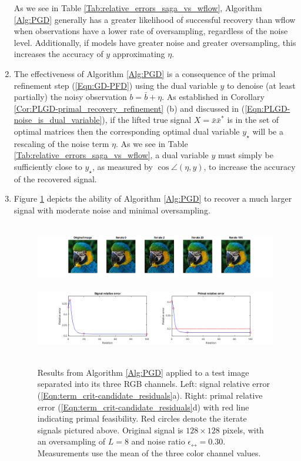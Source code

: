 \begin{enumerate}
As we see in Table \ref{Tab:relative_errors_saga_vs_wflow}, Algorithm \ref{Alg:PGD} generally has a greater likelihood of successful recovery than wflow when observations have a lower rate of oversampling, regardless of the noise level.  Additionally, if models have greater noise and greater oversampling, this increases the accuracy of $y$ approximating $\eta$.



\item

The effectiveness of Algorithm \ref{Alg:PGD} is a consequence of the primal refinement step (\ref{Eqn:GD-PFD}) using the dual variable $y$ to denoise (at least partially) the noisy observation $b = \bar{b} + \eta$.  As established in Corollary \ref{Cor:PLGD-primal_recovery_refinement} (b) and discussed in (\ref{Eqn:PLGD-noise_is_dual_variable}), if the lifted true signal $X = \bar{x}\bar{x}^*$ is in the set of optimal matrices then the corresponding optimal dual variable $y_\star$ will be a rescaling of the noise term $\eta$.  As we see in Table \ref{Tab:relative_errors_saga_vs_wflow}, a dual variable $y$ must simply be sufficiently close to $y_\star$, as measured by $\cos \angle (\eta, y)$, to increase the accuracy of the recovered signal.




\item

Figure \ref{Fig:parrot_signal_relative_error_2} depicts the ability of Algorithm \ref{Alg:PGD} to recover a much larger signal with moderate noise and minimal oversampling.

\begin{figure}[H]
\centering
\hbox{\hspace{-2.3cm} \includegraphics[scale=0.55]{parrot_signal_iterates} }
\hbox{\hspace{-2.5cm} \includegraphics[scale=0.6]{parrot_signal_relative_error_2} }
\caption{Results from Algorithm \ref{Alg:PGD} applied to a test image separated into its three RGB channels.  Left: signal relative error (\ref{Eqn:term_crit-candidate_residuals}a).  Right: primal relative error (\ref{Eqn:term_crit-candidate_residuals}d) with red line indicating primal feasibility.  Red circles denote the iterate signals pictured above.  Original signal is $128 \times 128$ pixels, with an oversampling of $L = 8$ and noise ratio $\epsilon_\rel = 0.30$.  Measurements use the mean of the three color channel values.}
\label{Fig:parrot_signal_relative_error_2}
\end{figure}


\end{enumerate}
